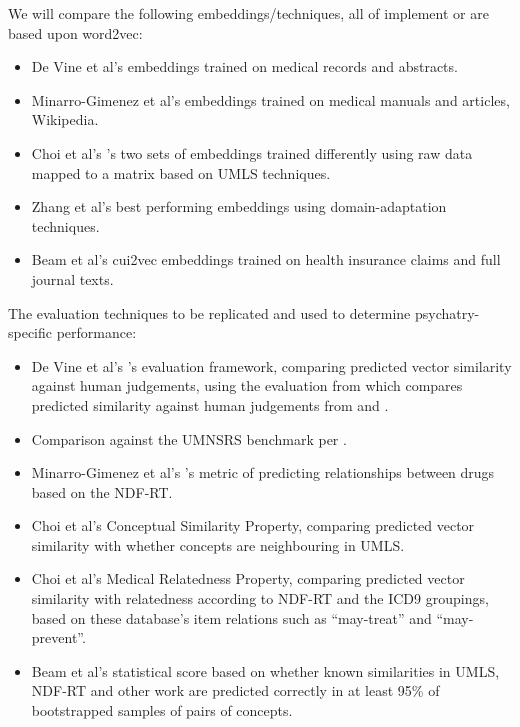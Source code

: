 \documentclass[10pt]{article}
\begin{document}
We will compare the following embeddings/techniques, all of implement or are based upon word2vec:
\begin{itemize}
	\item De Vine et al's  embeddings trained on medical records and abstracts.  
	\item Minarro-Gimenez et al's  embeddings trained on medical manuals and articles, Wikipedia.
	\item Choi et al's 's two sets of embeddings trained differently using raw data mapped to a matrix based on UMLS techniques.  
	\item Zhang et al's  best performing embeddings using domain-adaptation techniques. 
	\item Beam et al's cui2vec embeddings trained on health insurance claims and full journal texts. 
\end{itemize}

The evaluation techniques to be replicated and used to determine psychatry-specific performance:
\begin{itemize}
	\item De Vine et al's 's evaluation framework, comparing predicted vector similarity against human judgements, using the evaluation from \cite{koopmanEvaluationCorpusdrivenMeasures2012} which compares predicted similarity against human judgements from \cite{pedersenMeasuresSemanticSimilarity2007} and \cite{caviedesDevelopmentConceptualDistance2004}.
	\item Comparison against the UMNSRS benchmark per \cite{yuRetrofittingConceptVector2017}.
	\item Minarro-Gimenez et al's 's metric of predicting relationships between drugs based on the NDF-RT. 
	\item Choi et al's  Conceptual Similarity Property, comparing predicted vector similarity with whether concepts are neighbouring in UMLS. 
	\item Choi et al's  Medical Relatedness Property, comparing predicted vector similarity with relatedness according to NDF-RT and the ICD9 groupings, based on these database's item relations such as ``may-treat'' and ``may-prevent''. 
	\item Beam et al's  statistical score based on whether known similarities in UMLS, NDF-RT and other work are predicted correctly in at least 95\% of bootstrapped samples of pairs of concepts. 
\end{itemize}
\end{document}
